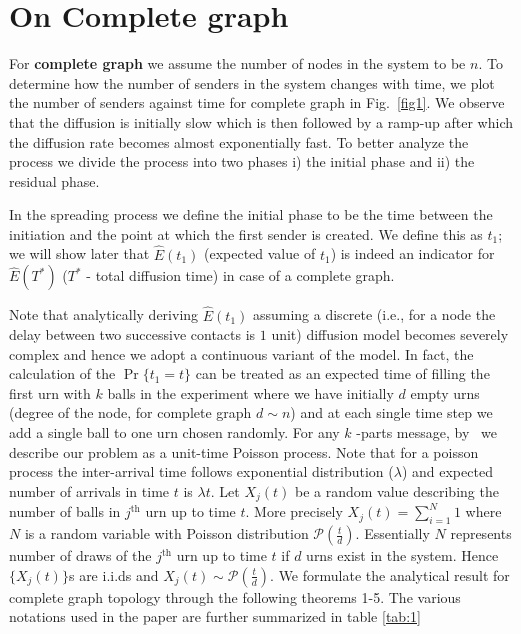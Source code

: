 \noindent
\section{On Complete graph}
\label{res_complete}
\noindent For {\bf complete graph} we assume the
number of nodes in the system to be $n$. 
To determine how the number of
senders in the system changes with time, we plot the number of senders
against time for complete graph in Fig.~\ref{fig1}. 
We observe that the diffusion is initially slow which is then followed by a ramp-up after which the diffusion rate becomes almost exponentially fast.
To better analyze the process we divide the process into two phases i) the initial phase and ii) the residual phase. 


  In the spreading process we define the initial phase to be the time between the
initiation and the point at which the first sender is created. We
define this as $t_1$; we will show later that $\hat E(t_1)$ (expected value of $t_1$) is
indeed an indicator for $\hat E(T^*)$ ($T^*$ - 
total diffusion time) in case of a complete graph.

Note that analytically deriving  $\hat E(t_1)$ assuming a  discrete 
(i.e., for a node the delay between two successive contacts is $1$ unit) diffusion model becomes severely complex and hence we adopt a continuous 
variant of the model. In fact, the calculation of the $\Pr \{ t_{1}=t\}$ can be treated as an expected time of filling the first urn with $k$
balls in the experiment where we have initially $d$ empty urns (degree of the node, for complete graph $d \sim n$) and at each
single time step we add a single ball to one urn chosen randomly. 
 For any $k$%
-parts message, by~\cite{kaplan1977generalization} we describe our problem
as a unit-time Poisson process. Note that for a poisson process the inter-arrival time follows exponential distribution ($\lambda$) and expected number of arrivals in time $t$ is $\lambda t$.  
 Let 
$X_{j}(t)$ be a random value describing the number of balls in $j^\textrm{th}$ urn up
to time $t$. More precisely $X_{j}(t)=\sum_{i=1}^{N}1$ where $N$ is a random variable 
with Poisson distribution $\mathcal{P}(\frac{t}{d})$. Essentially $N$ represents number of draws
of the $j^\textrm{th}$ urn up to time $t$ if $d$ urns exist in the system.
Hence $\{X_{j}(t)\}$s are i.i.ds and $X_{j}(t)\sim\mathcal{P}(\frac{t}{d}%
) $.  
{We formulate the analytical result for complete graph topology through the following theorems 1-5. The various notations used in the paper are further 
summarized in table \ref{tab:1}}



